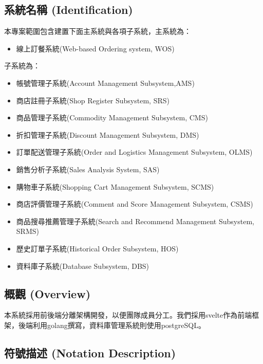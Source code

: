 \documentclass[a4paper, 12pt]{article}
\begin{document}
\subsection{系統名稱 (Identification)}

\noindent 本專案範圍包含建置下面主系統與各項子系統，主系統為：

\begin{itemize}
  \item 線上訂餐系統(Web-based Ordering system, WOS)
\end{itemize}

\noindent 子系統為：

\begin{itemize}

  \item 帳號管理子系統(Account Management Subsystem,AMS)
  \item 商店註冊子系統(Shop Register Subsystem, SRS)
  \item 商品管理子系統(Commodity Management Subsystem, CMS)
  \item 折扣管理子系統(Discount Management Subsystem, DMS)
  \item 訂單配送管理子系統(Order and Logistics Management Subsystem, OLMS)
  \item 銷售分析子系統(Sales Analysis System, SAS)
  \item 購物車子系統(Shopping Cart Management Subsystem, SCMS)
  \item 商店評價管理子系統(Comment and Score Management Subsystem, CSMS)
  \item 商品搜尋推薦管理子系統(Search and Recommend Management Subsystem,
SRMS)
  \item 歷史訂單子系統(Historical Order Subsystem, HOS)

  \item 資料庫子系統(Database Subsystem, DBS)

\end{itemize}


\subsection{概觀 (Overview)}

本系統採用前後端分離架構開發，以便團隊成員分工。我們採用svelte作為前端框架，後端利用golang撰寫，資料庫管理系統則使用postgreSQL。


\subsection{符號描述 (Notation Description)}
\end{document}
